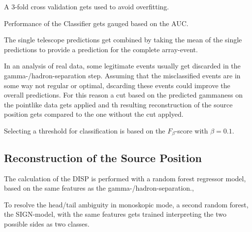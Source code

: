 A 3-fold cross validation gets used to avoid overfitting.

Performance of the Classifier gets gauged based 
on the AUC.

The single telescope predictions get combined by
taking the mean of the single
predictions to provide a prediction for the complete array-event.

In an analysis of real data, some legitimate events usually get discarded
in the gamma-/hadron-separation step.
Assuming that the misclassified events are in some way not regular or optimal, 
dscarding these events could improve the overall predictions.
For this reason a cut based on the predicted gammaness on the pointlike data
gets applied
and th resulting reconstruction of the source position 
gets compared to the one without the cut applyed.

Selecting a threshold for classification is based on
the $F_{\beta}$-score with $\beta = 0.1$.



\subsection{Reconstruction of the Source Position}
\label{sec:source_position}


The calculation of the DISP is performed with a random
forest regressor model, based on the same features as the gamma-/hadron-separation.,

To resolve the head/tail ambiguity in monoskopic mode,
a second random forest, the SIGN-model, with the same features gets trained
interpreting the two possible sides as two classes.

